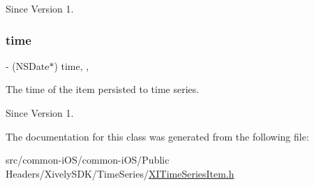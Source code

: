 \begin{DoxySince}{Since}
Version 1. 
\end{DoxySince}
\hypertarget{interface_x_i_time_series_item_a00b8c4d50ca16e65ceb3ea37cf24faaa}{}\label{interface_x_i_time_series_item_a00b8c4d50ca16e65ceb3ea37cf24faaa} 
\subsubsection{\texorpdfstring{time}{time}}
{\footnotesize\ttfamily -\/ (N\+S\+Date$\ast$) time\hspace{0.3cm}{\ttfamily [read]}, {\ttfamily [nonatomic]}, {\ttfamily [assign]}}



The time of the item persisted to time series. 

\begin{DoxySince}{Since}
Version 1. 
\end{DoxySince}


The documentation for this class was generated from the following file\+:\begin{DoxyCompactItemize}
\item 
src/common-\/i\+O\+S/common-\/i\+O\+S/\+Public Headers/\+Xively\+S\+D\+K/\+Time\+Series/\hyperlink{_x_i_time_series_item_8h}{X\+I\+Time\+Series\+Item.\+h}\end{DoxyCompactItemize}
